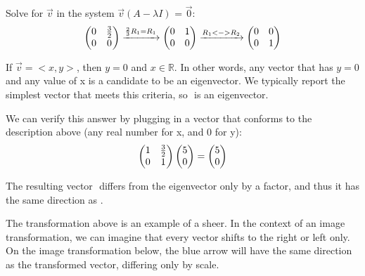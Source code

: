 \documentclass{article}
\begin{document}
 \par\noindent Solve for \( \vec v\) in the system \( \vec v (A - \lambda I)\) = \( \vec 0\):
 \[
  \left(\begin{array}{@{}cc@{}}
 	0 & \frac{3}{2} \\
 	0 & 0\\
 \end{array}\right) \xrightarrow[]{\frac{2}{3}R_1 = R_1} 
  \left(\begin{array}{@{}cc@{}}
 	0 & 1 \\
 	0 & 0\\
 \end{array}\right) \xrightarrow[]{R_1 <-> R_2}
  \left(\begin{array}{@{}cc@{}}
	0 & 0 \\
	0 & 1\\
\end{array}\right)
\]
\par \noindent If \( \vec v = <x,y> \), then \(y=0\) and \(x \in \mathbb{R}\). In other words, any vector that has \(y=0\) and any value of x is a candidate to be an eigenvector. We typically report the simplest vector that meets this criteria, so \(<1,0>\) is an eigenvector.
\newline
\newline
\newline
\begin{minipage}[c]{.5\linewidth}
\par \noindent We can verify this answer by plugging in a vector that conforms to the description above (any real number for x, and 0 for y):
\[ 
\left(\begin{array}{@{}cc@{}}
	1 & \frac{3}{2} \\
	0 & 1\\
\end{array}\right) 
\left(\begin{array}{@{}c@{}}
	5 \\
	0 \\
\end{array}\right) 
=   
\left(\begin{array}{@{}c@{}}
	5 \\
	0 \\
\end{array}\right) 
\]
\par \noindent The resulting vector \(<5,0>\) differs from the eigenvector only by a factor, and thus it has the same direction as \(<1,0>\).
\newline
\par \noindent The transformation above is an example of a sheer. In the context of an image transformation, we can imagine that every vector shifts to the right or left only. On the image transformation below, the blue arrow will have the same direction as the transformed vector, differing only by scale.
\end{minipage}
\end{document}
